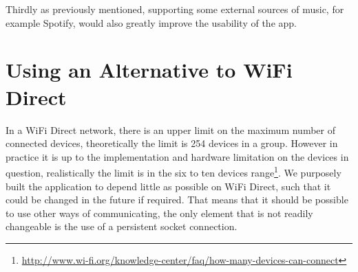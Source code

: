 Thirdly as previously mentioned, supporting some external sources of music, for example Spotify, would also greatly improve the usability of the app.

\section{Using an Alternative to WiFi Direct}
In a WiFi Direct network, there is an upper limit on the maximum number of connected devices, theoretically the limit is 254 devices in a group.
However in practice it is up to the implementation and hardware limitation on the devices in question, realistically the limit is in the six to ten devices range\footnote{\url{http://www.wi-fi.org/knowledge-center/faq/how-many-devices-can-connect}}.
We purposely built the application to depend little as possible on WiFi Direct, such that it could be changed in the future if required.
That means that it should be possible to use other ways of communicating, the only element that is not readily changeable is the use of a persistent socket connection.






